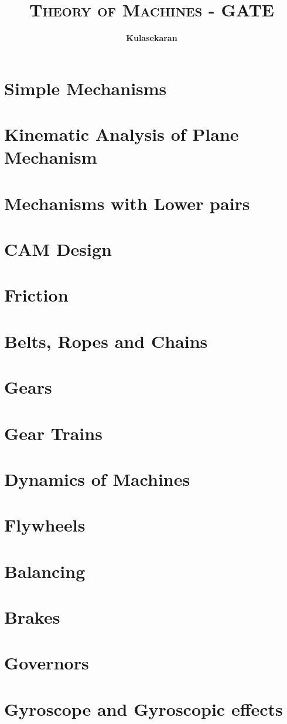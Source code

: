 \documentclass[8pt]{report}
\title{\Huge{\textsc{Theory of Machines - GATE}}}
\author{\huge{\textbf{Kulasekaran}}}
\begin{document}
\maketitle
\tableofcontents
\chapter{Simple Mechanisms}
\chapter{Kinematic Analysis of Plane Mechanism}
\chapter{Mechanisms with Lower pairs}
\chapter{CAM Design}
\chapter{Friction}
\chapter{Belts, Ropes and Chains}
\chapter{Gears}
\chapter{Gear Trains}
\chapter{Dynamics of Machines}
\chapter{Flywheels}
\chapter{Balancing}
\chapter{Brakes}
\chapter{Governors}
\chapter{Gyroscope and Gyroscopic effects}
\end{document}
